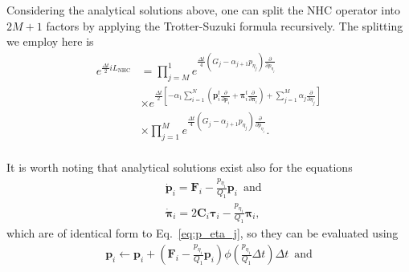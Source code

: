 \documentclass[aip,jcp,reprint,amsmath,amssymb,raggedbottom]{revtex4-1}
\newcommand{\mt}[1]{\boldsymbol{\mathbf{#1}}}           %
\newcommand{\vt}[1]{\boldsymbol{\mathbf{#1}}}           %
\newcommand{\tr}[1]{#1^t}                               %
\begin{document}
Considering the analytical solutions above, one can split the NHC operator into $2M+1$ factors by applying the Trotter-Suzuki formula recursively. The splitting we employ here is
\begin{equation}
\begin{split}
e^{\frac{\Delta t}{2} i\!L_\text{NHC}} &= \prod_{j=M}^1 e^{\frac{\Delta t}{4} (G_j - \alpha_{j+1} p_{\eta_j}) \frac{\partial}{\partial p_{\eta_j}}} \\
&\times e^{\frac{\Delta t}{2} \left[-\alpha_1 \sum\limits_{i=1}^N \left(\tr{\vt p}_i \frac{\partial}{\partial \vt p_i} + \tr{\vt \pi}_i \frac{\partial}{\partial \vt \pi_i}\right) + \sum\limits_{j=1}^M \alpha_j \frac{\partial}{\partial \eta_j} \right]} \\
&\times \prod_{j=1}^M e^{\frac{\Delta t}{4} (G_j - \alpha_{j+1} p_{\eta_j}) \frac{\partial}{\partial p_{\eta_j}}}.\\
\end{split}
\end{equation}


 
It is worth noting that analytical solutions exist also for the equations
\begin{align*}
&\dot{\vt p}_i = {\vt F}_i - \frac{p_{\eta_1}}{Q_1} \vt p_i \, \text{ and} \\ 
&\dot{\vt \pi}_i = 2 \mt C_i \vt \tau_i - \frac{p_{\eta_1}}{Q_1} \vt \pi_i,
\end{align*}
which are of identical form to Eq.~\ref{eq:p_eta_j}, so they can be evaluated using
\begin{equation}
\label{eq:p}
\begin{split}
{\vt p}_i \leftarrow {\vt p}_i + \left({\vt F}_i - \frac{p_{\eta_1}}{Q_1} {\vt p}_i \right) \phi\left(\frac{p_{\eta_1}}{Q_1} \Delta t \right) \Delta t \, \text{ and}\\
\end{split}
\end{equation}
\end{document}
